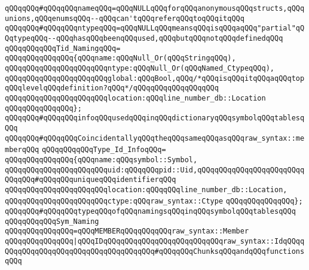 \verb|qQQqqQQq#qQQqqQQqnameqQQq=qQQqNULLqQQqforqQQqanonymousqQQqstructs,qQQqunions,qQQqenumsqQQq--qQQqcan'tqQQqreferqQQqtoqQQqitqQQq|\newline
\verb|qQQqqQQq#qQQqqQQqntypeqQQq=qQQqNULLqQQqmeansqQQqisqQQqaqQQq"partial"qQQqtypeqQQq--qQQqhasqQQqbeenqQQqused,qQQqbutqQQqnotqQQqdefinedqQQq|\newline
\verb|qQQqqQQqqQQqTid_NamingqQQq=|\newline
\verb|qQQqqQQqqQQqqQQq{qQQqname:qQQqNull_Or(qQQqStringqQQq),|\newline
\verb|qQQqqQQqqQQqqQQqqQQqqQQqntype:qQQqNull_Or(qQQqNamed_CtypeqQQq),|\newline
\verb|qQQqqQQqqQQqqQQqqQQqqQQqglobal:qQQqBool,qQQq/*qQQqisqQQqitqQQqaqQQqtopqQQqlevelqQQqdefinition?qQQq*/qQQqqQQqqQQqqQQqqQQq|\newline
\verb|qQQqqQQqqQQqqQQqqQQqqQQqlocation:qQQqline_number_db::Location|\newline
\verb|qQQqqQQqqQQqqQQq};|\newline
\newline
\verb|qQQqqQQq#qQQqqQQqinfoqQQqusedqQQqinqQQqdictionaryqQQqsymbolqQQqtablesqQQq|\newline
\newline
\verb|qQQqqQQq#qQQqqQQqCoincidentallyqQQqtheqQQqsameqQQqasqQQqraw_syntax::memberqQQq|\newline
\verb|qQQqqQQqqQQqType_Id_InfoqQQq=|\newline
\verb|qQQqqQQqqQQqqQQq{qQQqname:qQQqsymbol::Symbol,|\newline
\verb|qQQqqQQqqQQqqQQqqQQqqQQquid:qQQqqQQqpid::Uid,qQQqqQQqqQQqqQQqqQQqqQQqqQQqqQQq#qQQqqQQquniqueqQQqidentifierqQQq|\newline
\verb|qQQqqQQqqQQqqQQqqQQqqQQqlocation:qQQqqQQqline_number_db::Location,|\newline
\verb|qQQqqQQqqQQqqQQqqQQqqQQqctype:qQQqraw_syntax::Ctype|\newline
\verb|qQQqqQQqqQQqqQQq};|\newline
\newline
\verb|qQQqqQQq#qQQqqQQqtypeqQQqofqQQqnamingsqQQqinqQQqsymbolqQQqtablesqQQq|\newline
\verb|qQQqqQQqqQQqSym_Naming|\newline
\verb|qQQqqQQqqQQqqQQq=qQQqMEMBERqQQqqQQqqQQqraw_syntax::Member|\newline
\verb|qQQqqQQqqQQqqQQq|\verb#|qQQqIDqQQqqQQqqQQqqQQqqQQqqQQqqQQqraw_syntax::IdqQQqqQQqqQQqqQQqqQQqqQQqqQQqqQQqqQQqqQQq#\verb|#qQQqqQQqChunksqQQqandqQQqfunctionsqQQq|\newline
